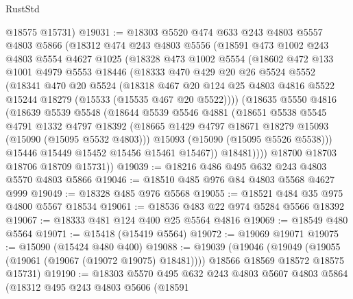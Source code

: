 \begin{lexlean}{RustStd}
\begin{coremodule}
      @18575
      @15731)
@19031 := @18303
    @5520
    @474
    @633
    @243
    @4803
    @5557
    @4803
    @5866
    (@18312
      @474
      @243
      @4803
      @5556
      (@18591
        @473
        @1002
        @243
        @4803
        @5554
        @4627
        @1025
        (@18328
          @473
          @1002
          @5554
          (@18602
            @472
            @133
            @1001
            @4979
            @5553
            @18446
            (@18333
              @470
              @429
              @20
              @26
              @5524
              @5552
              (@18341
                @470
                @20
                @5524
                (@18318
                  @467
                  @20
                  @124
                  @25
                  @4803
                  @4816
                  @5522
                  @15244
                  @18279
                  (@15533 (@15535 @467 @20 @5522))))
              (@18635
                @5550
                @4816
                (@18639
                  @5539
                  @5548
                  (@18644
                    @5539
                    @5546
                    @4881
                    (@18651
                      @5538
                      @5545
                      @4791
                      @1332
                      @4797
                      @18392
                      (@18665 @1429 @4797 @18671 @18279 @15093 (@15090 (@15095 @5532 @4803)))
                      @15093
                      (@15090 (@15095 @5526 @5538)))
                    @15446
                    @15449
                    @15452
                    @15456
                    @15461
                    @15467))
                @18481))))
        @18700
        @18703
        @18706
        @18709
        @15731))
@19039 := @18216 @486 @495 @632 @243 @4803 @5570 @4803 @5866
@19046 := @18510 @485 @976 @84 @4803 @5568 @4627 @999
@19049 := @18328 @485 @976 @5568
@19055 := @18521 @484 @35 @975 @4800 @5567 @18534
@19061 := @18536 @483 @22 @974 @5284 @5566 @18392
@19067 := @18333 @481 @124 @400 @25 @5564 @4816
@19069 := @18549 @480 @5564
@19071 := @15418 (@15419 @5564)
@19072 := @19069 @19071
@19075 := @15090 (@15424 @480 @400)
@19088 := @19039
    (@19046
      (@19049 (@19055 (@19061 (@19067 (@19072 @19075) @18481))))
      @18566
      @18569
      @18572
      @18575
      @15731)
@19190 := @18303
    @5570
    @495
    @632
    @243
    @4803
    @5607
    @4803
    @5864
    (@18312
      @495
      @243
      @4803
      @5606
      (@18591

\end{coremodule}
\end{lexlean}
